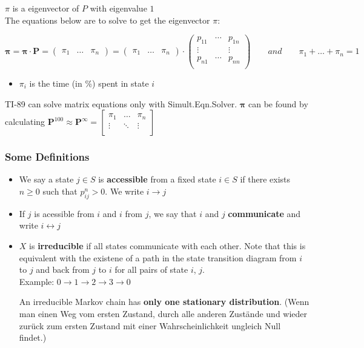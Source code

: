 $\pi$ is a eigenvector of $P$ with eigenvalue $1$\\

The equations below are to solve to get the eigenvector $\pi$:

\begin{equation}
\bm{\pi}=\bm{\pi}\cdot \bm{P}=\begin{pmatrix}\pi_1& \ldots & \pi_n\end{pmatrix}=\begin{pmatrix}\pi_1& \ldots & \pi_n\end{pmatrix}\cdot\begin{pmatrix}
		p_{11} &\cdots & p_{1n}\\
		\vdots& & 	\vdots\\
		p_{n1} &\cdots & p_{nn}\\
	\end{pmatrix}\qquad and\qquad\pi_1+\ldots+\pi_n=1\nonumber
\end{equation}

\begin{itemize}
\item $\pi_i$ is the time (in \%) spent in state $i$
\end{itemize}

TI-89 can solve matrix equations only with Simult.Eqn.Solver. $\bm \pi$ can be found by calculating 
$\bm P^{100} \approx \bm P^\infty = \begin{bmatrix}\pi_1 & \ldots & \pi_n\\ \vdots &\ddots &\vdots\\\end{bmatrix}$

\subsubsection{Some Definitions }
\begin{itemize}
\item We say a state $j\in S$ is \textbf{accessible} from a fixed state $i\in S$ if there exists $n\geq 0 $ such that $p_{ij}^n>0$. We write $i\rightarrow j$
\item If $j$ is acessible from $i$ and $i$ from $j$, we say that $i$ and $j$ \textbf{communicate} and write $i \leftrightarrow j$
\item $X$ is \textbf{irreducible} if all states communicate with each other. Note that this is equivalent with the existene of a path in the state transition diagram from $i$ to $j$ and back from $j$ to $i$ for all pairs of state $i$, $j$.\\
Example: $0 \to 1 \to 2 \to 3 \to 0$

An irreducible Markov chain has \textbf{only one stationary distribution}.
(Wenn man einen Weg vom ersten Zustand, durch alle anderen Zustände und wieder zurück zum ersten Zustand mit einer Wahrscheinlichkeit ungleich Null findet.)
\end{itemize}

